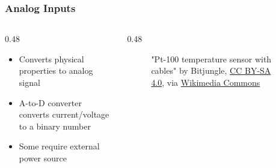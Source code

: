 \begin{frame}
    \frametitle{Analog Inputs}

    \begin{columns}
        \begin{column}{0.48\linewidth}
            \begin{itemize}
                \item Converts physical properties to analog signal
                \item A-to-D converter converts current/voltage to a binary number
                \item Some require external power source
            \end{itemize}
        \end{column}
        \begin{column}{0.48\linewidth}
            \begin{figure}
                \centering

                {\tiny "Pt-100 temperature sensor with cables" by Bitjungle, \href{https://creativecommons.org/licenses/by-sa/4.0}{CC BY-SA 4.0}, via \href{https://commons.wikimedia.org/wiki/File:Pt-100_temperature_sensor_with_cables.jpg}{Wikimedia Commons}\par}
            \end{figure}            
        \end{column}
    \end{columns}
\end{frame}

